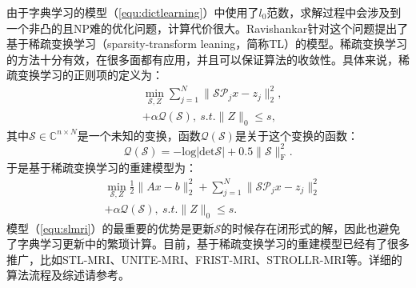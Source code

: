 由于字典学习的模型（\ref{equ:dictlearning}）中使用了$l_0$范数，求解过程中会涉及到一个非凸的且NP难的优化问题\cite{bruckstein2009sparse}，计算代价很大。Ravishankar针对这个问题提出了基于稀疏变换学习（sparsity-transform leaning，简称TL）的模型\cite{ravishankar2015efficient}。稀疏变换学习的方法十分有效，在很多面都有应用，并且可以保证算法的收敛性。具体来说，稀疏变换学习的正则项的定义为：
\begin{equation}
	\begin{aligned}
		&\min_{\mathcal{S},Z}\sum_{j=1}^N\|\mathcal{S}\mathcal{P}_jx-z_j\|^2_2,\\
		&+\alpha\mathcal{Q}(\mathcal{S}),\ s.t.\|Z\|_0\leq s, 
	\end{aligned}
\end{equation}
其中$\mathcal{S}\in \mathbb{C}^{n\times N}$是一个未知的变换，函数$\mathcal{Q}(\mathcal{S})$是关于这个变换的函数：
\begin{equation}
	\mathcal{Q}(\mathcal{S})=-\mathrm{log}|\mathrm{det}\mathcal{S}|+0.5\|\mathcal{S}\|^2_\mathrm{F}.
\end{equation}
于是基于稀疏变换学习的重建模型为：
\begin{equation}
	\begin{aligned}
		&\min_{\mathcal{S},Z}\frac{1}{2}\|Ax-b\|^2_2+\sum_{j=1}^N\|\mathcal{S}\mathcal{P}_jx-z_j\|^2_2\\
		&+\alpha\mathcal{Q}(\mathcal{S}),\ s.t.\|Z\|_0\leq s.
	\end{aligned}
	\label{equ:slmri}
\end{equation}
模型（\ref{equ:slmri}）的最重要的优势是更新$\mathcal{S}$的时候存在闭形式的解，因此也避免了字典学习更新中的繁琐计算。目前，基于稀疏变换学习的重建模型已经有了很多推广，比如STL-MRI\cite{ravishankar2015efficient}、UNITE-MRI\cite{ravishankar2016data}、FRIST-MRI\cite{wen2017frist}、STROLLR-MRI\cite{wen2018power}等。详细的算法流程及综述请参考\cite{wen2019transform}。

